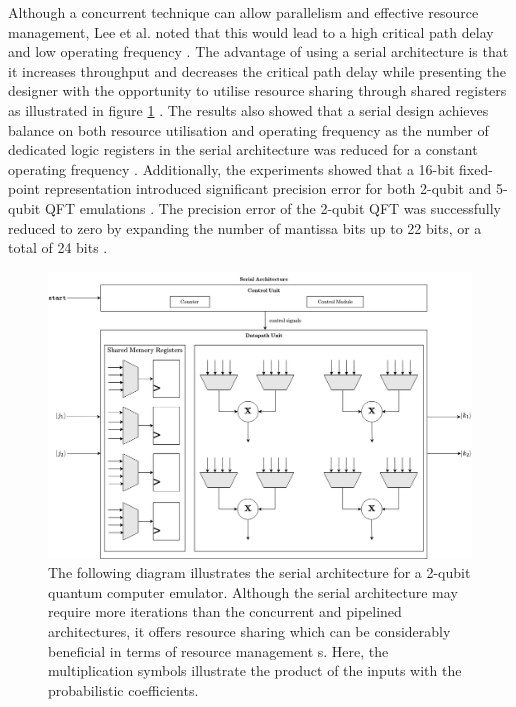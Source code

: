Although a concurrent technique can allow parallelism and effective resource management, Lee et al. noted that this would lead to a high critical path delay and low operating frequency \cite{lee2014fpga}. The advantage of using a serial architecture is that it increases throughput and decreases the critical path delay while presenting the designer with the opportunity to utilise resource sharing through shared registers as illustrated in figure \ref{fig:lee-serial-architecture} \cite{lee2014fpga}. The results also showed that a serial design achieves balance on both resource utilisation and operating frequency as the number of dedicated logic registers in the serial architecture was reduced for a constant operating frequency \cite{lee2014fpga}. Additionally, the experiments showed that a 16-bit fixed-point representation introduced significant precision error for both 2-qubit and 5-qubit QFT emulations \cite{lee2014fpga}. The precision error of the 2-qubit QFT was successfully reduced to zero by expanding the number of mantissa bits up to 22 bits, or a total of 24 bits \cite{lee2014fpga}.

\begin{figure}[!ht]
	\centering
	\includegraphics[width=1.0\linewidth]{body/ch3/figs/lee-serial-architecture}
	\caption[Serial Architecture of Emulated Quantum Computer by Lee et al.]{The following diagram illustrates the serial architecture for a 2-qubit quantum computer emulator. Although the serial architecture may require more iterations than the concurrent and pipelined architectures, it offers resource sharing which can be considerably beneficial in terms of resource management \cite{lee2014fpga}s. Here, the multiplication symbols illustrate the product of the inputs with the probabilistic coefficients.}
	\label{fig:lee-serial-architecture}
\end{figure}

